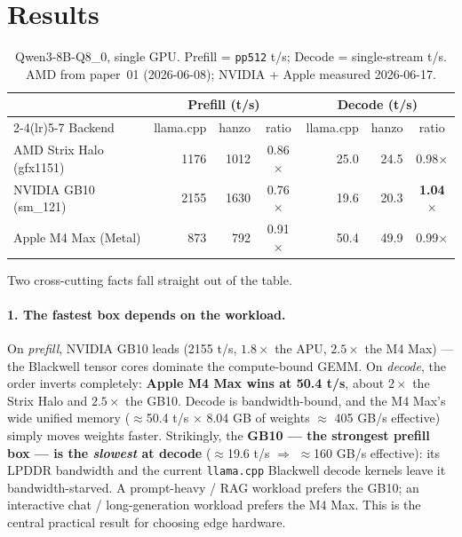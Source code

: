 \documentclass[11pt]{article}
\begin{document}
\section{Results}
\begin{table}[h]
\centering
\caption{Qwen3-8B-Q8\_0, single GPU. Prefill = \texttt{pp512} t/s; Decode = single-stream t/s.
AMD from paper~01 (2026-06-08); NVIDIA + Apple measured 2026-06-17.}
\begin{tabular}{l rr c rr c}
\toprule
& \multicolumn{3}{c}{\textbf{Prefill (t/s)}} & \multicolumn{3}{c}{\textbf{Decode (t/s)}}\\
\cmidrule(lr){2-4}\cmidrule(lr){5-7}
Backend & llama.cpp & hanzo & ratio & llama.cpp & hanzo & ratio\\
\midrule
AMD Strix Halo (gfx1151) & 1176 & 1012 & 0.86$\times$ & 25.0 & 24.5 & 0.98$\times$\\
NVIDIA GB10 (sm\_121)     & 2155 & 1630 & 0.76$\times$ & 19.6 & 20.3 & \textbf{1.04$\times$}\\
Apple M4 Max (Metal)      &  873 &  792 & 0.91$\times$ & 50.4 & 49.9 & 0.99$\times$\\
\bottomrule
\end{tabular}
\end{table}

\noindent Two cross-cutting facts fall straight out of the table.

\paragraph{1. The fastest box depends on the workload.}
On \emph{prefill}, NVIDIA GB10 leads (2155 t/s, $1.8\times$ the APU, $2.5\times$ the M4 Max) ---
the Blackwell tensor cores dominate the compute-bound GEMM. On \emph{decode}, the order inverts
completely: \textbf{Apple M4 Max wins at 50.4 t/s}, about $2\times$ the Strix Halo and
$2.5\times$ the GB10. Decode is bandwidth-bound, and the M4 Max's wide unified memory
($\approx$50.4 t/s $\times$ 8.04 GB of weights $\approx$ 405 GB/s effective) simply moves weights faster.
Strikingly, the \textbf{GB10 --- the strongest prefill box --- is the \emph{slowest} at decode}
($\approx$19.6 t/s $\Rightarrow$ $\approx$160 GB/s effective): its LPDDR bandwidth and the
current \texttt{llama.cpp} Blackwell decode kernels leave it bandwidth-starved. A prompt-heavy /
RAG workload prefers the GB10; an interactive chat / long-generation workload prefers the M4 Max.
This is the central practical result for choosing edge hardware.
\end{document}
